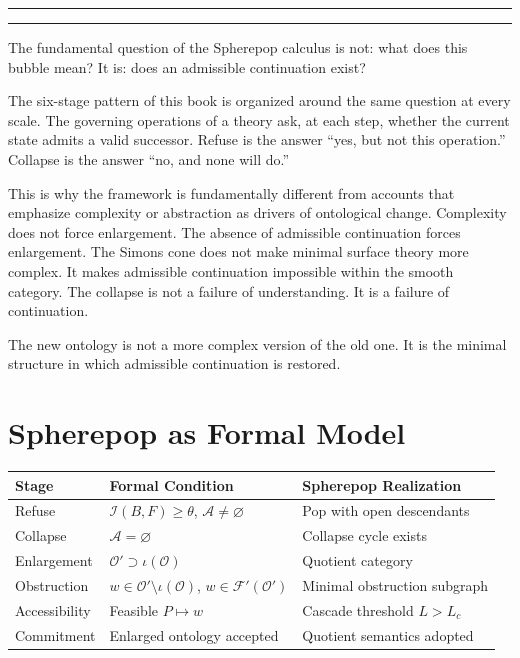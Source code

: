 \documentclass[12pt,oneside]{book}
\theoremstyle{plain}
\theoremstyle{definition}
\theoremstyle{remark}
\newcommand{\Oold}{\mathcal{O}}
\newcommand{\Onew}{\mathcal{O}'}
\newcommand{\F}{\mathcal{F}}
\newcommand{\Admiss}{\mathcal{A}}
\newcommand{\Inadmiss}{\mathcal{I}}
\newenvironment{interlude}[1]{%
  \vspace{1.4em}
  \begin{center}
  \rule{0.38\textwidth}{0.4pt}\quad{\small\itshape #1}\quad\rule{0.38\textwidth}{0.4pt}
  \end{center}
  \vspace{0.4em}
  \small\itshape
}{%
  \normalsize\normalfont
  \vspace{1.4em}
}
\begin{document}
\begin{interlude}{Continuation Admissible}
The fundamental question of the Spherepop calculus is not: what does this
bubble mean? It is: does an admissible continuation exist?

The six-stage pattern of this book is organized around the same question
at every scale. The governing operations of a theory ask, at each step,
whether the current state admits a valid successor. Refuse is the answer
``yes, but not this operation.'' Collapse is the answer ``no, and none
will do.''

This is why the framework is fundamentally different from accounts that
emphasize complexity or abstraction as drivers of ontological change.
Complexity does not force enlargement. The absence of admissible continuation
forces enlargement. The Simons cone does not make minimal surface theory more
complex. It makes admissible continuation impossible within the smooth
category. The collapse is not a failure of understanding. It is a failure
of continuation.

The new ontology is not a more complex version of the old one. It is the
minimal structure in which admissible continuation is restored.
\end{interlude}

\section{Spherepop as Formal Model}

\begin{center}
\renewcommand{\arraystretch}{1.3}
\begin{tabular}{lll}
\toprule
\textbf{Stage} & \textbf{Formal Condition} & \textbf{Spherepop Realization} \\
\midrule
Refuse & $\Inadmiss(B,F) \geq \theta$, $\Admiss \neq \varnothing$
  & Pop with open descendants \\
Collapse & $\Admiss = \varnothing$
  & Collapse cycle exists \\
Enlargement & $\Onew \supset \iota(\Oold)$
  & Quotient category \\
Obstruction & $w \in \Onew \setminus \iota(\Oold)$, $w \in \F'(\Onew)$
  & Minimal obstruction subgraph \\
Accessibility & Feasible $P \mapsto w$
  & Cascade threshold $L > L_c$ \\
Commitment & Enlarged ontology accepted
  & Quotient semantics adopted \\
\bottomrule
\end{tabular}
\end{center}
\end{document}
